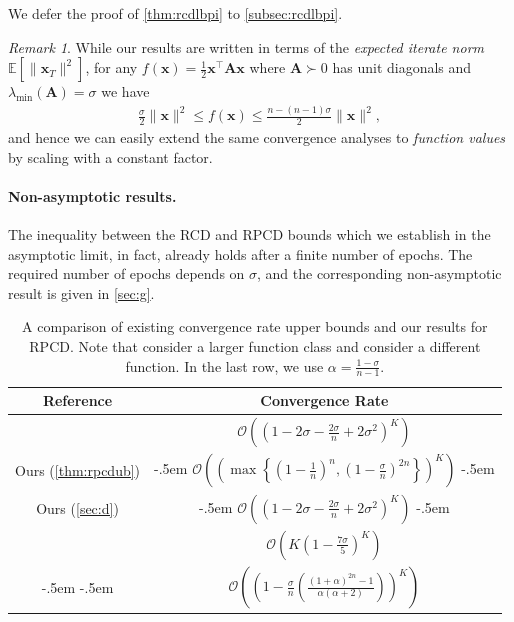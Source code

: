 \documentclass{article}
\theoremstyle{plain}
\theoremstyle{definition}
\theoremstyle{remark}
\newtheorem*{remark*}{Remark} %
\def\norm#1{\lVert#1\rVert}
\def\bigopen#1{\left(#1\right)}
\def\bigset#1{\left\{#1\right\}}
\def\bigclosed#1{\left[#1\right]}
\def\vx{{\bm{x}}}
\def\mA{{\bm{A}}}
\def\gO{{\mathcal{O}}}
\newcommand{\E}{\mathbb{E}}
\begin{document}
We defer the proof of \cref{thm:rcdlbpi} to \cref{subsec:rcdlbpi}.

\begin{remark*}
    While our results are written in terms of the \textit{expected iterate norm} $\E\bigclosed{\|\vx_{T}\|^2}$,
    for any $f(\vx) = \frac{1}{2} \vx^{\top} \mA \vx$ where $\mA \succ 0$ has unit diagonals and $\lambda_{\min} (\mA) = \sigma$ we have
    \begin{align*}
        \frac{\sigma}{2} \norm{\vx}^{2} \le f(\vx) \le \frac{n - (n-1) \sigma}{2} \norm{\vx}^{2},
    \end{align*}
    and hence we can easily extend the same convergence analyses to \textit{function values} by scaling with a constant factor.
\end{remark*}

\paragraph{Non-asymptotic results.} 
The inequality between the RCD and RPCD bounds which we establish in the asymptotic limit, in fact, already holds after a finite number of epochs.
The required number of epochs depends on $\sigma$, and the corresponding non-asymptotic result is given in \cref{sec:g}.

\begin{table}[t]
    \centering
    \caption{A comparison of existing convergence rate upper bounds and our results for RPCD.
    Note that \citet{wright17} consider a larger function class and \citet{gurbuzbalaban18} consider a different function.
    In the last row, we use $\alpha = \frac{1 - \sigma}{n - 1}$.}
    \scriptsize
    \begin{tabular}{|c|c|}
        \hline
        Reference & Convergence Rate \\
        \hline
        \hline
        \citet{lee2019} & $\gO \bigopen{\bigopen{1 - 2 \sigma - \frac{2 \sigma}{n} + 2 \sigma^2}^{K}}$ \\
        \hline
        Ours (\cref{thm:rpcdub}) & \kern-.5em $\gO \bigopen{\bigopen{\max \bigset{\bigopen{1 - \frac{1}{n}}^n\!\!\!, \bigopen{1 - \frac{\sigma}{n}}^{2n}}}^{K}}$ \kern-.5em \\
        \hline
        Ours (\cref{sec:d}) & \kern-.5em $\gO \bigopen{\bigopen{1 - 2 \sigma - \frac{2 \sigma}{n} + 2 \sigma^2}^{K}}$ \kern-.5em \\
        \hline
        \citet{wright17} & $\gO \bigopen{K \bigopen{1 - \frac{7\sigma}{5}}^{K}}$ \\
        \hline
        \kern-.5em \citet{gurbuzbalaban18} \kern-.5em & $\gO \bigopen{\bigopen{1 - \frac{\sigma}{n} \bigopen{\frac{(1 + \alpha)^{2n} - 1}{\alpha (\alpha + 2)}}}^{K}}$ \\
        \hline
    \end{tabular}
    \label{tab:comparison}
\end{table}
\end{document}
